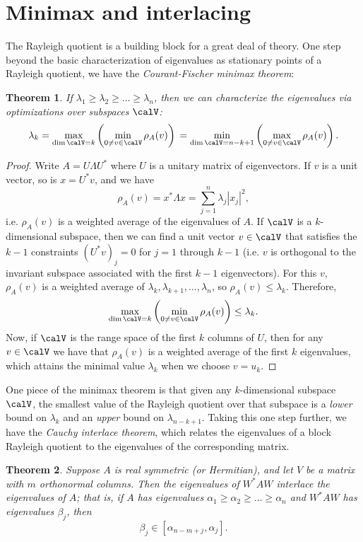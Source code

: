 \documentclass[12pt, leqno]{article} %
\newtheorem{theorem}{Theorem}
\begin{document}

\section{Minimax and interlacing}

The Rayleigh quotient is a building block for a great deal of theory.
One step beyond the basic characterization of eigenvalues as stationary
points of a Rayleigh quotient, we have
the {\em Courant-Fischer minimax theorem}:
\begin{theorem}
  If $\lambda_1 \geq \lambda_2 \geq \ldots \geq \lambda_n$, then
  we can characterize the eigenvalues via optimizations over
  subspaces $\calV$:
  \[
    \lambda_k
      = \max_{\dim \calV = k} \left( \min_{0 \neq v \in \calV} \rho_A(v) \right) \\
      = \min_{\dim \calV = n-k+1} \left( \max_{0 \neq v \in \calV} \rho_A(v) \right).
  \]
\end{theorem}

\begin{proof}
  Write $A = U \Lambda U^*$ where $U$ is a unitary matrix of eigenvectors.
  If $v$ is a unit vector, so is $x = U^* v$, and we have
  \[
    \rho_A(v) = x^* \Lambda x = \sum_{j=1}^n \lambda_j |x_j|^2,
  \]
  i.e. $\rho_A(v)$ is a weighted average of the eigenvalues
  of $A$.  If $\calV$ is a $k$-dimensional subspace, then we can find
  a unit vector $v \in \calV$ that satisfies the $k-1$ constraints
  $(U^* v)_j = 0$ for $j = 1$ through $k-1$ (i.e. $v$ is orthogonal to
  the invariant subspace associated with the first $k-1$
  eigenvectors).  For this $v$, $\rho_A(v)$ is a weighted average of
  $\lambda_k, \lambda_{k+1}, \ldots, \lambda_n$, so $\rho_A(v) \leq
  \lambda_k$.  Therefore,
  \[
      \max_{\dim \calV = k} \left( \min_{0 \neq v \in \calV} \rho_A(v) \right)
      \leq \lambda_k.
  \]
  Now, if $\calV$ is the range space of the first $k$ columns of $U$,
  then for any $v \in \calV$ we have that $\rho_A(v)$ is a weighted
  average of the first $k$ eigenvalues, which attains the minimal value
  $\lambda_k$ when we choose $v = u_k$.
\end{proof}

One piece of the minimax theorem is that given any $k$-dimensional subspace
$\calV$, the smallest value of the Rayleigh quotient over that
subspace is a {\em lower} bound on $\lambda_k$ and an {\em upper} bound
on $\lambda_{n-k+1}$.  Taking this one step further, we have the {\em Cauchy
interlace theorem}, which relates the eigenvalues of a block Rayleigh quotient
to the eigenvalues of the corresponding matrix.
\begin{theorem}
  Suppose $A$ is real symmetric (or Hermitian), and let $V$ be a
  matrix with $m$ orthonormal columns.  Then the eigenvalues of
  $W^* A W$ interlace the eigenvalues of $A$; that is, if $A$
  has eigenvalues $\alpha_1 \geq \alpha_2 \geq \ldots \geq \alpha_n$
  and $W^* A W$ has eigenvalues $\beta_j$, then
  \[
    \beta_j \in [\alpha_{n-m+j}, \alpha_j].
  \]
\end{theorem}
\end{document}
